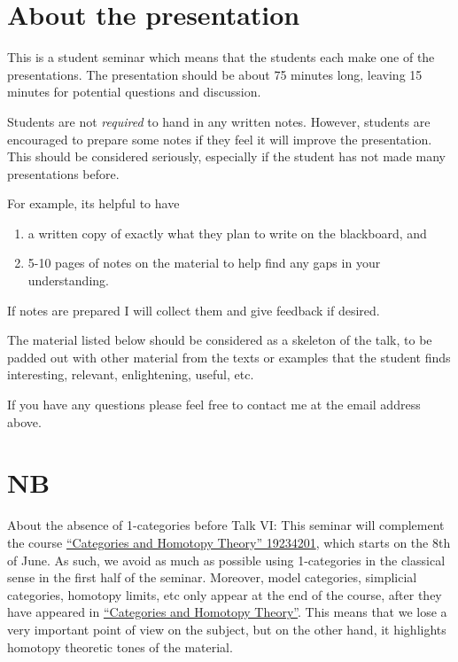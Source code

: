 \documentclass[a4paper]{amsart}
\numberwithin{figure}{section}
\theoremstyle{theorem}
\theoremstyle{definition}
\begin{document}
\section*{About the presentation}

This is a student seminar which means that the students each make one of the presentations. The presentation should be about 75 minutes long, leaving 15 minutes for potential questions and discussion.

Students are not \emph{required} to hand in any written notes. However, students are encouraged to prepare some notes if they feel it will improve the presentation. This should be considered seriously, especially if the student has not made many presentations before.

For example, its helpful to have
\begin{enumerate}
 \item a written copy of exactly what they plan to write on the blackboard, and 
 \item 5-10 pages of notes on the material to help find any gaps in your understanding.
\end{enumerate}
 
If notes are prepared I will collect them and give feedback if desired.

The material listed below should be considered as a skeleton of the talk, to be padded out with other material from the texts or examples that the student finds interesting, relevant, enlightening, useful, etc.

If you have any questions please feel free to contact me at the email address above.

\section*{NB}

About the absence of 1-categories before Talk VI: This seminar will complement the course \href{http://www.fu-berlin.de/vv/de/lv/365626?m=199248&pc=130123&sm=314889}{``Categories and Homotopy Theory'' 19234201}, which starts on the 8th of June. As such, we avoid as much as possible using 1-categories in the classical sense in the first half of the seminar. Moreover, model categories, simplicial categories, homotopy limits, etc only appear at the end of the course, after they have appeared in \href{http://www.fu-berlin.de/vv/de/lv/365626?m=199248&pc=130123&sm=314889}{``Categories and Homotopy Theory''}. This means that we lose a very important point of view on the subject, but on the other hand, it highlights homotopy theoretic tones of the material.
\end{document}
